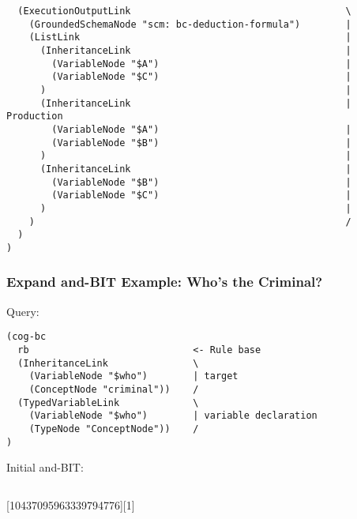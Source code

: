 \documentclass{beamer}
\begin{document}
\begin{frame}[fragile]
{\begin{verbatim}
  (ExecutionOutputLink                                      \
    (GroundedSchemaNode "scm: bc-deduction-formula")        |
    (ListLink                                               |
      (InheritanceLink                                      |
        (VariableNode "$A")                                 |
        (VariableNode "$C")                                 |
      )                                                     |
      (InheritanceLink                                      | Production
        (VariableNode "$A")                                 |
        (VariableNode "$B")                                 |
      )                                                     |
      (InheritanceLink                                      |
        (VariableNode "$B")                                 |
        (VariableNode "$C")                                 |
      )                                                     |
    )                                                       /
  )
)
\end{verbatim}
}

\end{frame}

\begin{frame}[fragile]
\frametitle{Expand and-BIT Example: Who's the Criminal?}

Query:
{\Tiny
\begin{verbatim}
(cog-bc
  rb                             <- Rule base
  (InheritanceLink               \
    (VariableNode "$who")        | target
    (ConceptNode "criminal"))    /
  (TypedVariableLink             \
    (VariableNode "$who")        | variable declaration
    (TypeNode "ConceptNode"))    /
)
\end{verbatim}    
}

\pause

Initial and-BIT:

  \begin{columns}

    \column{1.5in}

{\Tiny
{}
}

\column{2in}

    {\Tiny
\begin{semiverbatim}
  \alert<3->{[10437095963339794776][1]}
\end{semiverbatim}
    }

  \end{columns}

\end{frame}
\end{document}
